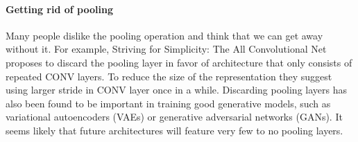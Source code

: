 \paragraph*{Getting rid of pooling} Many people dislike the pooling operation and think that we can get away without it. For example, Striving for Simplicity: The All Convolutional Net proposes to discard the pooling layer in favor of architecture that only consists of repeated CONV layers. To reduce the size of the representation they suggest using larger stride in CONV layer once in a while. Discarding pooling layers has also been found to be important in training good generative models, such as variational autoencoders (VAEs) or generative adversarial networks (GANs). It seems likely that future architectures will feature very few to no pooling layers.